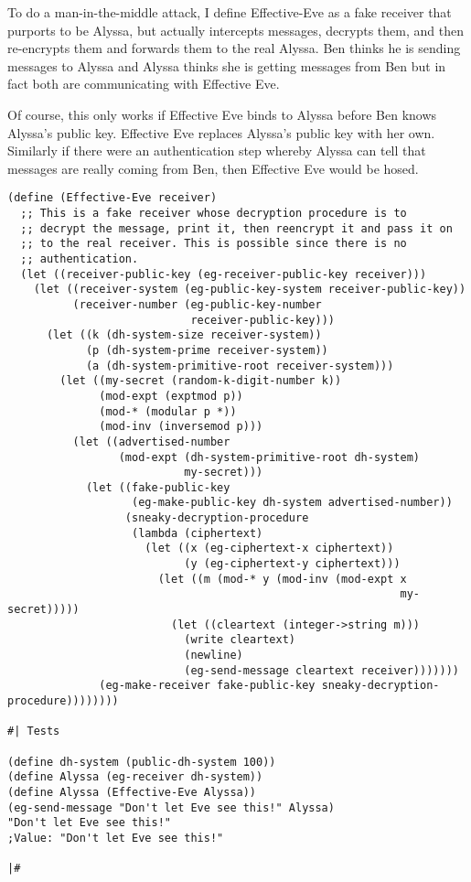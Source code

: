 \documentclass[12pt]{article}
\begin{document}
To do a man-in-the-middle attack, I define Effective-Eve as a fake
receiver that purports to be Alyssa, but actually intercepts
messages, decrypts them, and then re-encrypts them and forwards
them to the real Alyssa. Ben thinks he is sending messages to
Alyssa and Alyssa thinks she is getting messages from Ben but in
fact both are communicating with Effective Eve.

Of course, this only works if Effective Eve binds to Alyssa before
Ben knows Alyssa's public key. Effective Eve replaces Alyssa's
public key with her own. Similarly if there were an authentication
step whereby Alyssa can tell that messages are really coming from
Ben, then Effective Eve would be hosed.

\begin{verbatim}
(define (Effective-Eve receiver)
  ;; This is a fake receiver whose decryption procedure is to
  ;; decrypt the message, print it, then reencrypt it and pass it on
  ;; to the real receiver. This is possible since there is no
  ;; authentication.
  (let ((receiver-public-key (eg-receiver-public-key receiver)))
    (let ((receiver-system (eg-public-key-system receiver-public-key))
          (receiver-number (eg-public-key-number
                            receiver-public-key)))
      (let ((k (dh-system-size receiver-system))
            (p (dh-system-prime receiver-system))
            (a (dh-system-primitive-root receiver-system)))
        (let ((my-secret (random-k-digit-number k))
              (mod-expt (exptmod p))
              (mod-* (modular p *))
              (mod-inv (inversemod p)))
          (let ((advertised-number
                 (mod-expt (dh-system-primitive-root dh-system)
                           my-secret)))
            (let ((fake-public-key
                   (eg-make-public-key dh-system advertised-number))
                  (sneaky-decryption-procedure
                   (lambda (ciphertext)
                     (let ((x (eg-ciphertext-x ciphertext))
                           (y (eg-ciphertext-y ciphertext)))
                       (let ((m (mod-* y (mod-inv (mod-expt x
                                                            my-secret)))))
                         (let ((cleartext (integer->string m)))
                           (write cleartext)
                           (newline)
                           (eg-send-message cleartext receiver)))))))
              (eg-make-receiver fake-public-key sneaky-decryption-procedure))))))))

#| Tests

(define dh-system (public-dh-system 100))
(define Alyssa (eg-receiver dh-system))
(define Alyssa (Effective-Eve Alyssa))
(eg-send-message "Don't let Eve see this!" Alyssa)
"Don't let Eve see this!"
;Value: "Don't let Eve see this!"

|#
\end{verbatim}
\end{document}
